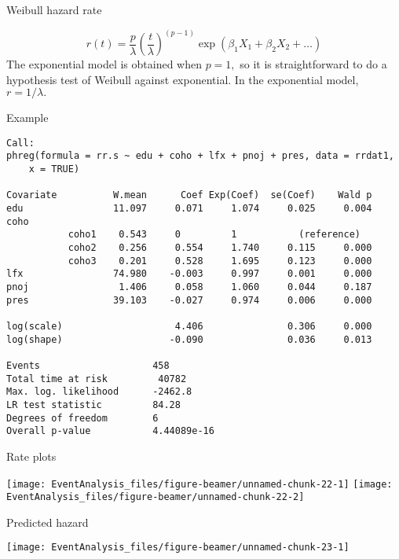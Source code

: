 \documentclass[10pt,ignorenonframetext,]{beamer}
\begin{document}
\begin{frame}{Weibull hazard rate}

\[
r(t) = \frac{p}{\lambda} \left( \frac{t}{\lambda} \right)^{(p-1)} \exp(\beta_1 X_1 + \beta_2 X_2 + \dots)
\] The exponential model is obtained when \(p = 1,\) so it is
straightforward to do a hypothesis test of Weibull against exponential.
In the exponential model, \(r = 1/\lambda.\)

\end{frame}

\begin{frame}[fragile]{Example}

\scriptsize

\begin{verbatim}
Call:
phreg(formula = rr.s ~ edu + coho + lfx + pnoj + pres, data = rrdat1, 
    x = TRUE)

Covariate          W.mean      Coef Exp(Coef)  se(Coef)    Wald p
edu                11.097     0.071     1.074     0.025     0.004 
coho 
           coho1    0.543     0         1           (reference)
           coho2    0.256     0.554     1.740     0.115     0.000 
           coho3    0.201     0.528     1.695     0.123     0.000 
lfx                74.980    -0.003     0.997     0.001     0.000 
pnoj                1.406     0.058     1.060     0.044     0.187 
pres               39.103    -0.027     0.974     0.006     0.000 

log(scale)                    4.406               0.306     0.000 
log(shape)                   -0.090               0.036     0.013 

Events                    458 
Total time at risk         40782 
Max. log. likelihood      -2462.8 
LR test statistic         84.28 
Degrees of freedom        6 
Overall p-value           4.44089e-16
\end{verbatim}

\end{frame}

\begin{frame}{Rate plots}

\texttt{[image: EventAnalysis\_files/figure-beamer/unnamed-chunk-22-1]}
\texttt{[image: EventAnalysis\_files/figure-beamer/unnamed-chunk-22-2]}

\end{frame}

\begin{frame}{Predicted hazard}

\begin{center}\texttt{[image: EventAnalysis\_files/figure-beamer/unnamed-chunk-23-1]} \end{center}

\end{frame}
\end{document}
